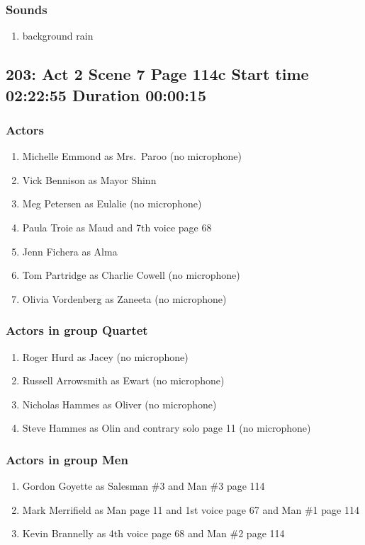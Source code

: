 \subsubsection{Sounds}
\begin{enumerate}
\item background rain
\end{enumerate}
\subsection{203: Act 2 Scene 7 Page 114c Start time 02:22:55 Duration 00:00:15}

\subsubsection{Actors}
\begin{enumerate}
\item Michelle Emmond as Mrs.~Paroo (no microphone)
\item Vick Bennison as Mayor Shinn
\item Meg Petersen as Eulalie (no microphone)
\item Paula Troie as Maud and 7th voice page 68
\item Jenn Fichera as Alma
\item Tom Partridge as Charlie Cowell (no microphone)
\item Olivia Vordenberg as Zaneeta (no microphone)
\end{enumerate}
\subsubsection{Actors in group Quartet}
\begin{enumerate}
\item Roger Hurd as Jacey (no microphone)
\item Russell Arrowsmith as Ewart (no microphone)
\item Nicholas Hammes as Oliver (no microphone)
\item Steve Hammes as Olin and contrary solo page 11 (no microphone)
\end{enumerate}
\subsubsection{Actors in group Men}
\begin{enumerate}
\item Gordon Goyette as Salesman \#3 and Man \#3 page 114
\item Mark Merrifield as Man page 11 and 1st voice page 67 and Man \#1 page 114
\item Kevin Brannelly as 4th voice page 68 and Man \#2 page 114
\end{enumerate}
